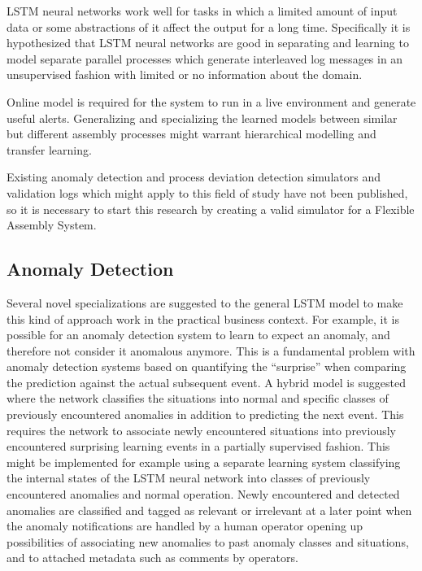 \documentclass[a4paper,10pt]{article}
\begin{document}
LSTM neural networks work well for tasks in which a limited amount of input data or some abstractions of it affect the output for a long time. Specifically
it is hypothesized that LSTM neural networks are good in separating and learning to model separate parallel processes which generate interleaved log messages
in an unsupervised fashion with limited or no information about the domain.

Online model is required for the system to run in a live environment and generate useful alerts. Generalizing and specializing the learned models between similar but
different assembly processes might warrant hierarchical modelling and transfer learning.

Existing anomaly detection and process deviation detection simulators and validation logs which might apply to this field of study have not been published,
so it is necessary to start this research by creating a valid simulator for a Flexible Assembly System.

\subsection{Anomaly Detection}

Several novel specializations are suggested to the general LSTM model to make this kind of approach work in the practical business context.
For example, it is possible for an anomaly detection system to learn to expect an anomaly, and therefore not consider it anomalous anymore.
This is a fundamental problem with anomaly detection systems based on quantifying the ``surprise'' when comparing the prediction against
the actual subsequent event. A hybrid model is suggested where the network classifies the situations into normal and specific classes
of previously encountered anomalies in addition to predicting the next event. This requires the network to associate newly encountered situations into previously
encountered surprising learning events in a partially supervised fashion. This might be implemented for example using a separate learning system classifying the internal
states of the LSTM neural network into classes of previously encountered anomalies and normal operation.
Newly encountered and detected anomalies are classified and tagged as relevant or irrelevant at a later point when the anomaly notifications are handled
by a human operator opening up possibilities of associating new anomalies to past anomaly classes and situations, and to attached metadata such as comments by operators.
\end{document}
